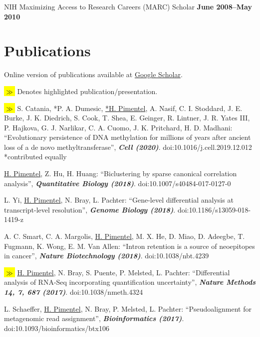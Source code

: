\documentclass[11pt,notitlepage]{article} %
\newcommand{\hlc}[2][blue]{ {\sethlcolor{#1} \hl{#2}} }
\newcommand{\hlpub}{\hlc[Dandelion]{{\color{white}$\gg$} }}
\begin{document}
\medskip

NIH Maximizing Access to Research Careers (MARC) Scholar \hfill {\bf
  June 2008--May 2010}


  \newpage
\section*{Publications}
\bigskip
Online version of publications available at \href{https://scholar.google.com/citations?user=WfzyRAUAAAAJ&hl=en}{Google Scholar}.

\bigskip

\hlpub{} Denotes highlighted publication/presentation.

\bigskip


\begin{etaremune}

  \item\hlpub{} S. Catania, *P. A. Dumesic, \underline{*H. Pimentel}, A. Nasif, C. I. Stoddard, J. E. Burke, J. K. Diedrich, S. Cook, T. Shea, E. Geinger, R. Lintner, J. R. Yates III, P. Hajkova, G. J. Narlikar, C. A. Cuomo, J. K. Pritchard, H. D. Madhani: ``Evolutionary persistence of DNA methylation for millions of years after ancient loss of a de novo methyltransferase'', {\bf \emph{Cell (2020)}}. doi:10.1016/j.cell.2019.12.012 *contributed equally

  \item \underline{H. Pimentel}, Z. Hu, H. Huang: ``Biclustering by sparse
canonical correlation analysis'', {\bf \emph{Quantitative Biology (2018)}}. doi:10.1007/s40484-017-0127-0

  \item L. Yi, \underline{H. Pimentel}, N. Bray, L. Pachter: ``Gene-level differential analysis at transcript-level resolution'', {\bf \emph{Genome Biology (2018)}}. doi:10.1186/s13059-018-1419-z

  \item A. C. Smart, C. A. Margolis, \underline{H. Pimentel}, M. X. He, D. Miao, D. Adeegbe, T. Fugmann, K. Wong, E. M. Van Allen: ``Intron retention is a source of neoepitopes in cancer'',  {\bf \emph{Nature Biotechnology (2018)}}. doi:10.1038/nbt.4239

  \item\hlpub{}\underline{H. Pimentel}, N. Bray, S. Puente, P. Melsted, L. Pachter:  ``Differential analysis of RNA-Seq incorporating quantification uncertainty'', {\bf \emph{Nature Methods 14, 7, 687 (2017)}}. doi:10.1038/nmeth.4324

  \item L. Schaeffer, \underline{H. Pimentel}, N. Bray, P. Melsted, L. Pachter: ``Pseudoalignment for metagenomic read assignment'', {\bf \emph{Bioinformatics (2017)}}. doi:10.1093/bioinformatics/btx106


\end{etaremune}
\end{document}

